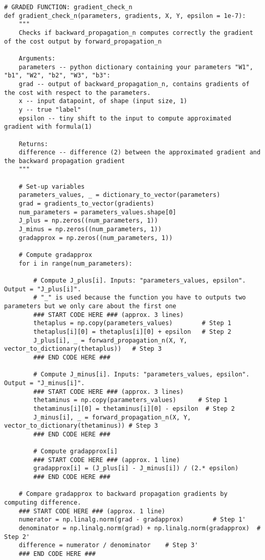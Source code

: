 \begin{verbatim}
# GRADED FUNCTION: gradient_check_n
def gradient_check_n(parameters, gradients, X, Y, epsilon = 1e-7):
    """
    Checks if backward_propagation_n computes correctly the gradient of the cost output by forward_propagation_n
    
    Arguments:
    parameters -- python dictionary containing your parameters "W1", "b1", "W2", "b2", "W3", "b3":
    grad -- output of backward_propagation_n, contains gradients of the cost with respect to the parameters. 
    x -- input datapoint, of shape (input size, 1)
    y -- true "label"
    epsilon -- tiny shift to the input to compute approximated gradient with formula(1)
    
    Returns:
    difference -- difference (2) between the approximated gradient and the backward propagation gradient
    """
    
    # Set-up variables
    parameters_values, _ = dictionary_to_vector(parameters)
    grad = gradients_to_vector(gradients)
    num_parameters = parameters_values.shape[0]
    J_plus = np.zeros((num_parameters, 1))
    J_minus = np.zeros((num_parameters, 1))
    gradapprox = np.zeros((num_parameters, 1))
    
    # Compute gradapprox
    for i in range(num_parameters):
        
        # Compute J_plus[i]. Inputs: "parameters_values, epsilon". Output = "J_plus[i]".
        # "_" is used because the function you have to outputs two parameters but we only care about the first one
        ### START CODE HERE ### (approx. 3 lines)
        thetaplus = np.copy(parameters_values)        # Step 1
        thetaplus[i][0] = thetaplus[i][0] + epsilon   # Step 2
        J_plus[i], _ = forward_propagation_n(X, Y, vector_to_dictionary(thetaplus))   # Step 3
        ### END CODE HERE ###

        # Compute J_minus[i]. Inputs: "parameters_values, epsilon". Output = "J_minus[i]".
        ### START CODE HERE ### (approx. 3 lines)
        thetaminus = np.copy(parameters_values)      # Step 1
        thetaminus[i][0] = thetaminus[i][0] - epsilon  # Step 2        
        J_minus[i], _ = forward_propagation_n(X, Y, vector_to_dictionary(thetaminus)) # Step 3
        ### END CODE HERE ###

        # Compute gradapprox[i]
        ### START CODE HERE ### (approx. 1 line)
        gradapprox[i] = (J_plus[i] - J_minus[i]) / (2.* epsilon)
        ### END CODE HERE ###

    # Compare gradapprox to backward propagation gradients by computing difference.
    ### START CODE HERE ### (approx. 1 line)
    numerator = np.linalg.norm(grad - gradapprox)        # Step 1'
    denominator = np.linalg.norm(grad) + np.linalg.norm(gradapprox)  # Step 2'
    difference = numerator / denominator    # Step 3'
    ### END CODE HERE ###


\end{verbatim}
